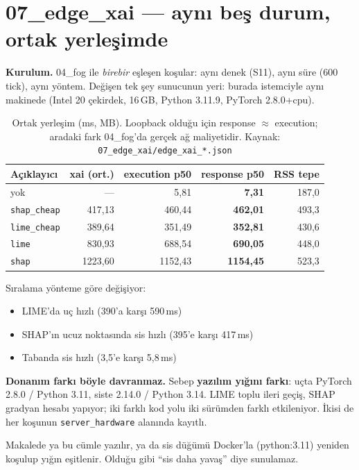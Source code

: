 \documentclass[11pt,a4paper]{report}
\newcommand{\ms}{\,ms}
\newcommand{\kod}[1]{\texttt{\small #1}}
\newcommand{\dosya}[1]{\texttt{\footnotesize #1}}
\begin{document}
\section{07\_edge\_xai --- aynı beş durum, ortak yerleşimde}

\textbf{Kurulum.} 04\_fog ile \emph{birebir} eşleşen koşular: aynı denek (S11),
aynı süre (600 tick), aynı yöntem. Değişen tek şey sunucunun yeri: burada
istemciyle aynı makinede (Intel 20 çekirdek, 16\,GB, Python 3.11.9,
PyTorch 2.8.0+cpu).

\begin{table}[H]
\centering\small
\begin{tabular}{@{}lrrrr@{}}
\toprule
\textbf{Açıklayıcı} & \textbf{xai (ort.)} & \textbf{execution p50} & \textbf{response p50} & \textbf{RSS tepe} \\
\midrule
yok               & ---       & 5{,}81   & \textbf{7{,}31}   & 187{,}0 \\
\kod{shap\_cheap} & 417{,}13  & 460{,}44 & \textbf{462{,}01} & 493{,}3 \\
\kod{lime\_cheap} & 389{,}64  & 351{,}49 & \textbf{352{,}81} & 430{,}6 \\
\kod{lime}        & 830{,}93  & 688{,}54 & \textbf{690{,}05} & 448{,}0 \\
\kod{shap}        & 1223{,}60 & 1152{,}43 & \textbf{1154{,}45} & 523{,}3 \\
\bottomrule
\end{tabular}
\caption{Ortak yerleşim (ms, MB). Loopback olduğu için response $\approx$
execution; aradaki fark 04\_fog'da gerçek ağ maliyetidir.
Kaynak: \dosya{07\_edge\_xai/edge\_xai\_*.json}}
\end{table}

\begin{uyari}
Sıralama yönteme göre değişiyor:
\begin{itemize}[nosep,leftmargin=1.4em]
\item LIME'da uç hızlı (390'a karşı 590\ms)
\item SHAP'ın ucuz noktasında sis hızlı (395'e karşı 417\ms)
\item Tabanda sis hızlı (3{,}5'e karşı 5{,}8\ms)
\end{itemize}
\textbf{Donanım farkı böyle davranmaz.} Sebep \textbf{yazılım yığını farkı}:
uçta PyTorch 2.8.0 / Python 3.11, siste 2.14.0 / Python 3.14. LIME toplu ileri
geçiş, SHAP gradyan hesabı yapıyor; iki farklı kod yolu iki sürümden farklı
etkileniyor. İkisi de her koşunun \kod{server\_hardware} alanında kayıtlı.

Makalede ya bu cümle yazılır, ya da sis düğümü Docker'la (python:3.11) yeniden
koşulup yığın eşitlenir. Olduğu gibi ``sis daha yavaş'' diye sunulamaz.
\end{uyari}
\end{document}
